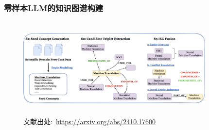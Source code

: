 %
%
%

\begin{frame}
	\frametitle{零样本\textrm{LLM}的知识图谱构建}
\begin{figure}[h!]
\centering
\vskip -8pt
\includegraphics[height=2.0in,width=3.90in,viewport=0 0 215 90,clip]{Figures/KG_Chem-KG-LLM.png}
\caption{\tiny\textrm{文献出处:~\url{https://arxiv.org/abs/2410.17600}}}%
\label{Fig:KG_Chem-LLM_KG}
\end{figure}
\end{frame}

